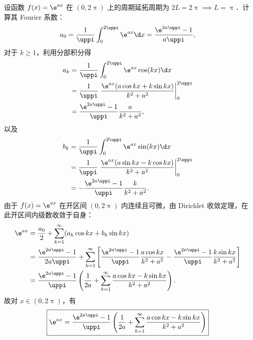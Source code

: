 \begin{myproof}
    设函数 $f(x) = \e^{ax}$ 在 $(0, 2\uppi)$ 上的周期延拓周期为 $2L = 2\uppi \implies L = \uppi$．计算其 Fourier 系数：
    \begin{equation}\label{eq:exp-a0-val}
        a_0 = \frac{1}{\uppi} \int_{0}^{2\uppi} \e^{ax} \d x = \frac{\e^{2a\uppi} - 1}{a\uppi},
    \end{equation}
    对于 $k \geqslant 1$，利用分部积分得
    \begin{equation}\label{eq:exp-ak-val}
        \begin{aligned}
            a_k & = \frac{1}{\uppi} \int_{0}^{2\uppi} \e^{ax} \cos(kx) \d x                                      \\
                & = \frac{1}{\uppi} \left. \frac{\e^{ax}(a \cos kx + k \sin kx)}{k^2 + a^2} \right|_{0}^{2\uppi} \\
                & = \frac{\e^{2a\uppi} - 1}{\uppi} \frac{a}{k^2 + a^2},
        \end{aligned}
    \end{equation}
    以及
    \begin{equation}\label{eq:exp-bk-val}
        \begin{aligned}
            b_k & = \frac{1}{\uppi} \int_{0}^{2\uppi} \e^{ax} \sin(kx) \d x                                      \\
                & = \frac{1}{\uppi} \left. \frac{\e^{ax}(a \sin kx - k \cos kx)}{k^2 + a^2} \right|_{0}^{2\uppi} \\
                & = -\frac{\e^{2a\uppi} - 1}{\uppi} \frac{k}{k^2 + a^2}.
        \end{aligned}
    \end{equation}
    由于 $f(x) = \e^{ax}$ 在开区间 $(0, 2\uppi)$ 内连续且可微，由 Dirichlet 收敛定理，在此开区间内级数收敛于自身：
    \begin{equation}\label{eq:exp-sum}
        \begin{aligned}
            \e^{ax} & = \frac{a_0}{2} + \sum_{k=1}^{\infty} (a_k \cos kx + b_k \sin kx)                                                                                                                               \\
                    & = \frac{\e^{2a\uppi} - 1}{2a\uppi} + \sum_{k=1}^{\infty} \left[ \frac{\e^{2a\uppi} - 1}{\uppi} \frac{a \cos kx}{k^2 + a^2} - \frac{\e^{2a\uppi} - 1}{\uppi} \frac{k \sin kx}{k^2 + a^2} \right] \\
                    & = \frac{\e^{2a\uppi} - 1}{\uppi} \left( \frac{1}{2a} + \sum_{k=1}^{\infty} \frac{a \cos kx - k \sin kx}{k^2 + a^2} \right).
        \end{aligned}
    \end{equation}
    故对 $x \in (0, 2\uppi)$，有
    \begin{equation}
        \boxed{\e^{ax} = \frac{\e^{2a\uppi} - 1}{\uppi} \left( \frac{1}{2a} + \sum_{k=1}^{\infty} \frac{a \cos kx - k \sin kx}{k^2 + a^2} \right)}
    \end{equation}
\end{myproof}

